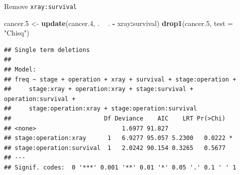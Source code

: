 \documentclass[ignorenonframetext,]{beamer}
\newenvironment{Shaded}{\begin{snugshade}}{\end{snugshade}}
\newcommand{\DataTypeTok}[1]{\textcolor[rgb]{0.13,0.29,0.53}{#1}}
\newcommand{\FloatTok}[1]{\textcolor[rgb]{0.00,0.00,0.81}{#1}}
\newcommand{\KeywordTok}[1]{\textcolor[rgb]{0.13,0.29,0.53}{\textbf{#1}}}
\newcommand{\NormalTok}[1]{#1}
\newcommand{\OperatorTok}[1]{\textcolor[rgb]{0.81,0.36,0.00}{\textbf{#1}}}
\newcommand{\StringTok}[1]{\textcolor[rgb]{0.31,0.60,0.02}{#1}}
\begin{document}
\begin{frame}[fragile]{Remove \texttt{xray:survival}}
\protect\hypertarget{remove-xraysurvival}{}

\scriptsize

\begin{Shaded}
\begin{Highlighting}[]
\NormalTok{cancer}\FloatTok{.5}\NormalTok{ <-}\StringTok{ }\KeywordTok{update}\NormalTok{(cancer}\FloatTok{.4}\NormalTok{, . }\OperatorTok{~}\StringTok{ }\NormalTok{. }\OperatorTok{-}\StringTok{ }\NormalTok{xray}\OperatorTok{:}\NormalTok{survival)}
\KeywordTok{drop1}\NormalTok{(cancer}\FloatTok{.5}\NormalTok{, }\DataTypeTok{test =} \StringTok{"Chisq"}\NormalTok{)}
\end{Highlighting}
\end{Shaded}

\begin{verbatim}
## Single term deletions
## 
## Model:
## freq ~ stage + operation + xray + survival + stage:operation + 
##     stage:xray + operation:xray + stage:survival + operation:survival + 
##     stage:operation:xray + stage:operation:survival
##                          Df Deviance    AIC    LRT Pr(>Chi)  
## <none>                        1.6977 91.827                  
## stage:operation:xray      1   6.9277 95.057 5.2300   0.0222 *
## stage:operation:survival  1   2.0242 90.154 0.3265   0.5677  
## ---
## Signif. codes:  0 '***' 0.001 '**' 0.01 '*' 0.05 '.' 0.1 ' ' 1
\end{verbatim}

\normalsize

\end{frame}
\end{document}
